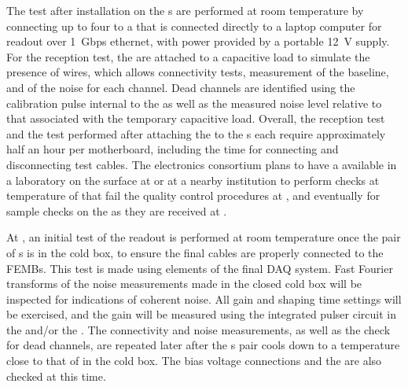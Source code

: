 The test after installation on the s are performed at room temperature 
by connecting up to four  to a  that is 
connected directly to a laptop computer for readout over 1~Gbps
ethernet, with power provided by a portable 12~V supply. For 
the reception test, the  are attached to a capacitive 
load to simulate the presence of wires, which allows connectivity 
tests, measurement of the baseline, and \rms of the noise for 
each channel. Dead channels are identified using the calibration 
pulse internal to the   as well as the measured
noise level relative to that associated with the temporary capacitive load.
Overall, the reception test and the test performed after attaching the
 to the s each require approximately half an hour per
motherboard, including  the time for connecting and disconnecting test cables.
The  electronics consortium plans to have a  available
in a laboratory on the surface at  or at a nearby institution to perform checks at \lntwo temperature
of  that fail the quality control procedures at ,
and eventually for sample checks on the  as they are received
at . 

At , an initial test of the readout is performed at room temperature
once the pair of s is in the cold box, to ensure the final cables are
properly connected to the FEMBs. This test is made using elements of the final DAQ system.
Fast Fourier transforms of
the noise measurements made in the closed cold box will be inspected for indications
of coherent noise. All  gain and shaping time settings will be exercised,
and the gain will be measured using the integrated pulser circuit in the 
 and/or the . The connectivity and noise measurements, as well
as the check for dead channels, are repeated later after the s pair cools
down to a temperature close to that of \lntwo in the cold box. The bias voltage
connections and the  are also checked at this time.

